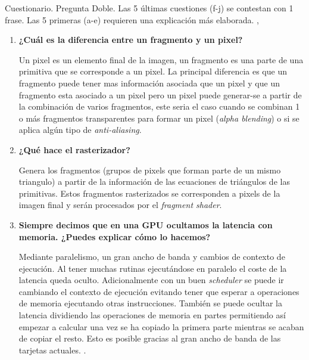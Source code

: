 
\begin{pregunta}{Cuestionario. Pregunta Doble. Las 5 últimas cuestiones (f-j) se contestan con 1 frase. Las 5
primeras (a-e) requieren una explicación más elaborada.}
\sep{}

\begin{enumerate}[label=\textbf{(\alph*)}]
    \item \textbf{¿Cuál es la diferencia entre un fragmento y un pixel?}

        Un pixel es un elemento final de la imagen, un fragmento es una parte de
        una primitiva que se corresponde a un pixel. La principal diferencia es
        que un fragmento puede tener mas información asociada que un pixel y que
        un fragmento esta asociado a un pixel pero un pixel puede generar-se a
        partir de la combinación de varios fragmentos, este seria el caso cuando
        se combinan 1 o más fragmentos transparentes para formar un pixel
        (\emph{alpha blending}) o si se aplica algún tipo de
        \emph{anti-aliasing}.

    \item \textbf{¿Qué hace el rasterizador?}

        Genera los fragmentos (grupos de pixels que forman parte de un mismo
        triangulo) a partir de la información de las ecuaciones de
        triángulos de las primitivas. Estos fragmentos rasterizados se
        corresponden a pixels de la imagen final y serán procesados por el
        \emph{fragment shader}.

\item \textbf{Siempre decimos que en una GPU ocultamos la latencia con memoria. ¿Puedes explicar cómo lo hacemos?}

        Mediante paralelismo, un gran ancho de banda y cambios de contexto de
        ejecución. Al tener muchas rutinas ejecutándose en paralelo el coste de
        la latencia queda oculto.  Adicionalmente con un buen \emph{scheduler}
        se puede ir cambiando el contexto de ejecución evitando tener que
        esperar a operaciones de memoria ejecutando otras instrucciones. También
        se puede ocultar la latencia dividiendo las operaciones de memoria en
        partes permitiendo así empezar a calcular una vez se ha copiado la
        primera parte mientras se acaban de copiar el resto. Esto es posible
        gracias al gran ancho de banda de las tarjetas actuales.
        \cite{volkov_understanding_nodate}.


\end{enumerate}
\end{pregunta}
